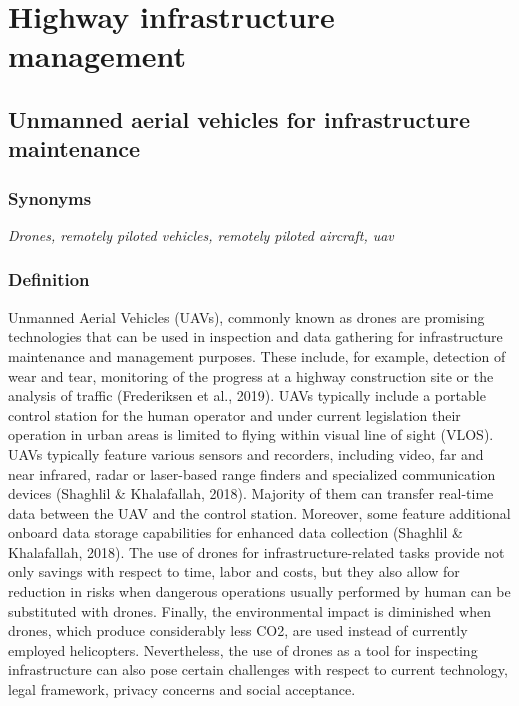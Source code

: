 \documentclass[
]{book}
\begin{document}
\hypertarget{highway}{%
\chapter{Highway infrastructure management}\label{highway}}

\hypertarget{uav}{%
\section{Unmanned aerial vehicles for infrastructure maintenance}\label{uav}}

\hypertarget{synonyms-5}{%
\subsection*{Synonyms}\label{synonyms-5}}

\emph{Drones, remotely piloted vehicles, remotely piloted aircraft, uav}

\hypertarget{definition-6}{%
\subsection*{Definition}\label{definition-6}}

Unmanned Aerial Vehicles (UAVs), commonly known as drones are promising technologies that can be used in inspection and data gathering for infrastructure maintenance and management purposes. These include, for example, detection of wear and tear, monitoring of the progress at a highway construction site or the analysis of traffic (Frederiksen et al., 2019). UAVs typically include a portable control station for the human operator and under current legislation their operation in urban areas is limited to flying within visual line of sight (VLOS). UAVs typically feature various sensors and recorders, including video, far and near infrared, radar or laser-based range finders and specialized communication devices (Shaghlil \& Khalafallah, 2018). Majority of them can transfer real-time data between the UAV and the control station. Moreover, some feature additional onboard data storage capabilities for enhanced data collection (Shaghlil \& Khalafallah, 2018). The use of drones for infrastructure-related tasks provide not only savings with respect to time, labor and costs, but they also allow for reduction in risks when dangerous operations usually performed by human can be substituted with drones. Finally, the environmental impact is diminished when drones, which produce considerably less CO2, are used instead of currently employed helicopters. Nevertheless, the use of drones as a tool for inspecting infrastructure can also pose certain challenges with respect to current technology, legal framework, privacy concerns and social acceptance.
\end{document}

